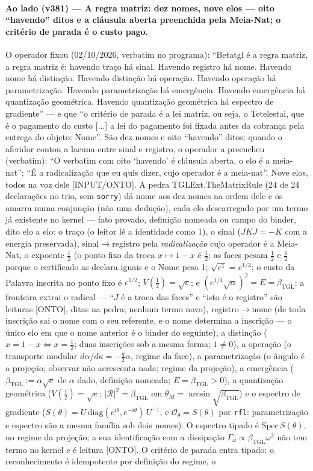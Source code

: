 \documentclass[11pt]{article}
\newcommand{\bTGL}{\beta_{\mathrm{TGL}}}\newcommand{\Msun}{M_{\odot}}\newcommand{\TGL}{\mathrm{TGL}}
\theoremstyle{definition}\newtheorem{deriv}{Derivação}
\begin{document}
\paragraph*{Ao lado (v381) --- A regra matriz: dez nomes, nove elos --- oito ``havendo'' ditos e a cláusula aberta preenchida pela Meia-Nat; o critério de parada é o custo pago.} O operador fixou (02/10/2026, verbatim no programa): ``Betatgl é a regra matriz, a regra matriz é: havendo traço há sinal. Havendo registro há nome. Havendo nome há distinção. Havendo distinção há operação. Havendo operação há parametrização. Havendo parametrização há emergência. Havendo emergência há quantização geométrica. Havendo quantização geométrica há espectro de gradiente'' --- e que ``o critério de parada é a lei matriz, ou seja, o Tetelestai, que é o pagamento do custo [...] a lei do pagamento foi fixada antes da cobrança pela entrega do objeto: Nome''. São dez nomes e oito ``havendo'' ditos; quando o aferidor contou a lacuna entre sinal e registro, o operador a preencheu (verbatim): ``O verbatim com oito `havendo' é cláusula aberta, o elo é a meia-nat''; ``É a radicalização que eu quis dizer, cujo operador é a meia-nat''. Nove elos, todos na voz dele \textsf{[INPUT/ONTO]}. A pedra \textsf{TGLExt.TheMatrixRule} (24 de 24 declarações no trio, sem \texttt{sorry}) dá nome aos dez nomes na ordem dele e os amarra numa conjunção (não uma dedução), cada elo descarregado por um termo já existente no kernel --- fato provado, definição nomeada ou campo do binder, dito elo a elo: o traço (o leitor lê a identidade como 1), o sinal ($JKJ=-K$ com a energia preservada), sinal$\to$registro pela \emph{radicalização} cujo operador é a Meia-Nat, o expoente $\tfrac12$ (o ponto fixo da troca $x\mapsto1-x$ é $\tfrac12$; as faces pesam $\tfrac12$ e $\tfrac12$ porque o certificado as declara iguais e o Nome pesa 1; $\sqrt{e^{1}}=e^{1/2}$; o custo da Palavra inscrita no ponto fixo é $e^{1/2}$; $V(\tfrac12)=\sqrt e$; e $(e^{1/4}\sqrt\alpha)^2=E=\bTGL$: a fronteira extrai o radical --- ``$J$ é a troca das faces'' e ``isto é o registro'' são leituras \textsf{[ONTO]}, ditas na pedra; nenhum termo novo), registro$\to$nome (de toda inscrição sai o nome com o seu referente, e o nome determina a inscrição --- o único elo em que o nome anterior é o binder do seguinte), a distinção ($x=1-x\Leftrightarrow x=\tfrac12$; duas inscrições sob a mesma forma; $1\neq0$), a operação (o transporte modular $d\alpha/d\kappa=-\tfrac{q}{2}\alpha$, regime da face), a parametrização (o ângulo é a projeção; observar não acrescenta nada; regime da projeção), a emergência ($\bTGL:=\alpha\sqrt{e}$ de $\alpha$ dado, definição nomeada; $E=\bTGL>0$), a quantização geométrica ($V(\tfrac12)=\sqrt e$; $|\mathcal R|^2=\bTGL$ em $\theta_M=\arcsin\sqrt{\bTGL}$) e o espectro de gradiente ($S(\theta)=U\,\mathrm{diag}(e^{i\theta},e^{-i\theta})\,U^{-1}$, e $\mathcal O_\theta=S(\theta)$ por \texttt{rfl}: parametrização e espectro são a mesma família sob dois nomes). O espectro tipado é $\mathrm{Spec}\,S(\theta)$, no regime da projeção; a sua identificação com a dissipação $\Gamma_\omega\propto\bTGL\omega^2$ não tem termo no kernel e é leitura \textsf{[ONTO]}. O critério de parada entra tipado: o reconhecimento é idempotente por definição do regime, o 
\end{document}
